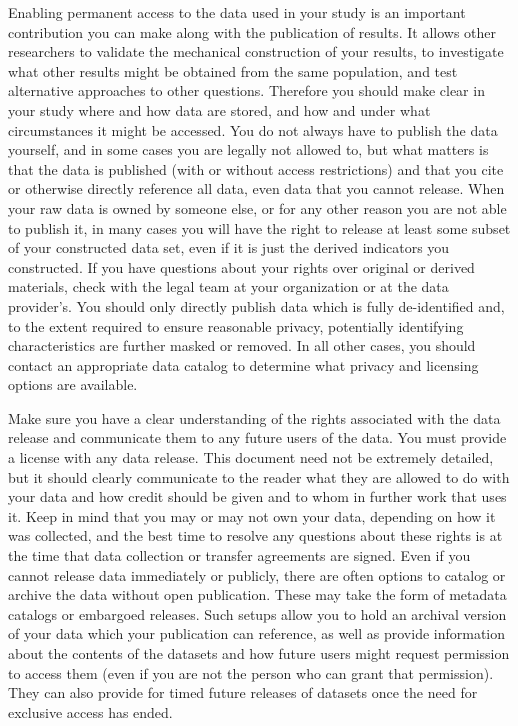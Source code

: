 Enabling permanent access to the data used in your study
is an important contribution you can make along with the publication of results.
It allows other researchers to validate the mechanical construction of your results,
to investigate what other results might be obtained from the same population,
and test alternative approaches to other questions.
Therefore you should make clear in your study
where and how data are stored, and how and under what circumstances it might be accessed.
You do not always have to publish the data yourself,
and in some cases you are legally not allowed to,
but what matters is that the data is published
(with or without access restrictions)
and that you cite or otherwise directly reference all data,
even data that you cannot release.
When your raw data is owned by someone else,
or for any other reason you are not able to publish it,
in many cases you will have the right to release
at least some subset of your constructed data set,
even if it is just the derived indicators you constructed.
If you have questions about your rights over original or derived materials,
check with the legal team at your organization or at the data provider's.
You should only directly publish data which is fully de-identified
and, to the extent required to ensure reasonable privacy,
potentially identifying characteristics are further masked or removed.
In all other cases, you should contact an appropriate data catalog
to determine what privacy and licensing options are available.

Make sure you have a clear understanding of the rights associated with the data release
and communicate them to any future users of the data.
You must provide a license with any data release.
This document need not be extremely detailed,
but it should clearly communicate to the reader what they are allowed to do with your data and
how credit should be given and to whom in further work that uses it.
Keep in mind that you may or may not own your data,
depending on how it was collected,
and the best time to resolve any questions about these rights
is at the time that data collection or transfer agreements are signed.
Even if you cannot release data immediately or publicly,
there are often options to catalog or archive the data without open publication.
These may take the form of metadata catalogs or embargoed releases.
Such setups allow you to hold an archival version of your data
which your publication can reference,
as well as provide information about the contents of the datasets
and how future users might request permission to access them
(even if you are not the person who can grant that permission).
They can also provide for timed future releases of datasets
once the need for exclusive access has ended.

